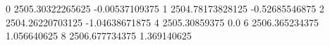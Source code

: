 0 2505.30322265625 -0.00537109375
1 2504.78173828125 -0.52685546875
2 2504.26220703125 -1.04638671875
4 2505.30859375 0.0
6 2506.365234375 1.056640625
8 2506.677734375 1.369140625
